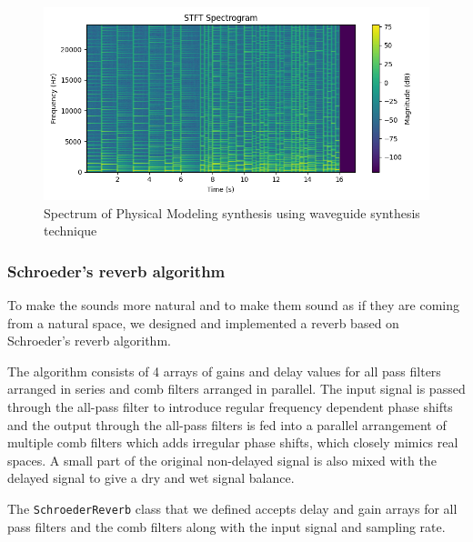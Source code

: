 \documentclass[11pt]{article}
\begin{document}
\begin{figure}[H]
    \centering
    \includegraphics[width=1 \textwidth]{waveguide_spectrum.png}
    \caption{Spectrum of Physical Modeling synthesis using waveguide synthesis technique} %
    \label{fig:waveguide spec} %
\end{figure}

\subsubsection{Schroeder's reverb algorithm}

To make the sounds more natural and to make them sound as if they are coming from a natural space, we designed and implemented a reverb based on Schroeder's reverb algorithm. 

The algorithm consists of 4 arrays of gains and delay values for all pass filters arranged in series and comb filters arranged in parallel. The input signal is passed through the all-pass filter to introduce regular frequency dependent phase shifts  and the output through the all-pass filters is fed into a parallel arrangement of multiple comb filters which adds irregular phase shifts, which closely mimics real spaces. A small part of the original non-delayed signal is also mixed with the delayed signal to give a dry and wet signal balance. 

The \texttt{SchroederReverb} class that we defined accepts delay and gain arrays for all pass filters and the comb filters along with the input signal and sampling rate. 
\end{document}
